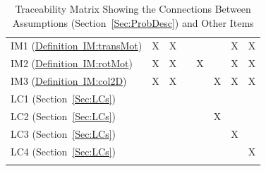 \documentclass[12pt]{article}
\begin{document}
\begin{longtable}{l l l l l l l l}
\\
IM1 (\hyperref[IM:transMot]{Definition~IM:transMot}) & X & X &  &  &  & X & X
\\
IM2 (\hyperref[IM:rotMot]{Definition~IM:rotMot}) & X & X &  & X &  & X & X
\\
IM3 (\hyperref[IM:col2D]{Definition~IM:col2D}) & X & X &  &  & X & X & X
\\
LC1 (Section~\ref{Sec:LCs}) &  &  &  &  &  &  & 
\\
LC2 (Section~\ref{Sec:LCs}) &  &  &  &  & X &  & 
\\
LC3 (Section~\ref{Sec:LCs}) &  &  &  &  &  & X & 
\\
LC4 (Section~\ref{Sec:LCs}) &  &  &  &  &  &  & X
\\
\bottomrule
\caption{Traceability Matrix Showing the Connections Between Assumptions (Section~\ref{Sec:ProbDesc}) and Other Items}
\label{Table:TraceyAssumpsOther}
\end{longtable}
\end{document}
